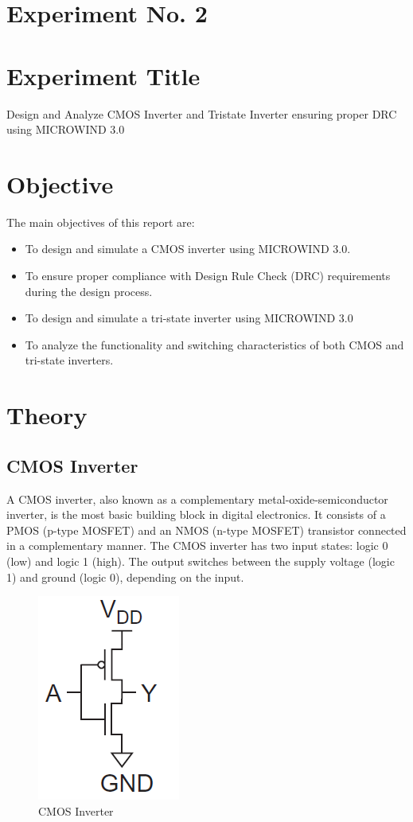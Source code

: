 \documentclass[a4paper,12pt]{article}
\begin{document}
\section{Experiment No. 2}

\section{Experiment Title }
Design and Analyze CMOS Inverter and Tristate Inverter ensuring proper DRC using MICROWIND 3.0
\section{Objective}
The main objectives of this report are:

\begin{itemize}
	\item To design and simulate a CMOS inverter using MICROWIND 3.0.
	\item To ensure proper compliance with Design Rule Check (DRC) requirements during the design process.
	\item To design and simulate a tri-state inverter using MICROWIND 3.0
	\item To analyze the functionality and switching characteristics of both CMOS and tri-state inverters.
\end{itemize}
\section{Theory}

\subsection{CMOS Inverter}
A CMOS inverter, also known as a complementary metal-oxide-semiconductor inverter, is the most basic building block in digital electronics. It consists of a PMOS (p-type MOSFET) and an NMOS (n-type MOSFET) transistor connected in a complementary manner. The CMOS inverter has two input states: logic 0 (low) and logic 1 (high). The output switches between the supply voltage (logic 1) and ground (logic 0), depending on the input.
\begin{figure}[H]
	\centering
	\includegraphics[width=0.2\linewidth]{images/c/ci1.2}
	\caption{CMOS Inverter}
	\label{fig:ci1}
\end{figure}
\end{document}
